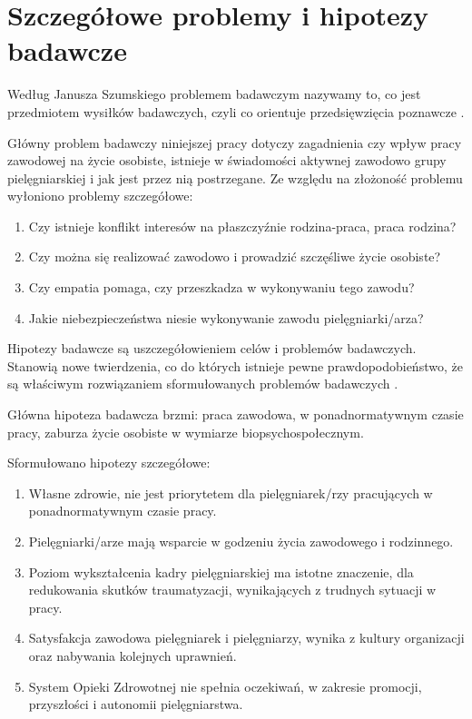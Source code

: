 \documentclass[a4paper,12pt,twoside,openany]{report}
\begin{document}
\section{Szczegółowe problemy i hipotezy badawcze}
Według Janusza Szumskiego problemem badawczym nazywamy to, co jest przedmiotem wysiłków badawczych, czyli co orientuje przedsięwzięcia poznawcze \cite{janusz}.

Główny problem badawczy niniejszej pracy dotyczy zagadnienia czy wpływ pracy zawodowej na życie osobiste, istnieje w świadomości aktywnej zawodowo grupy pielęgniarskiej i jak jest przez nią postrzegane. Ze względu na złożoność problemu wyłoniono problemy szczegółowe:
\begin{enumerate}
	\item Czy istnieje konflikt interesów na płaszczyźnie rodzina-praca, praca rodzina?
	\item Czy można się realizować zawodowo i prowadzić szczęśliwe życie osobiste?
	\item Czy empatia pomaga, czy przeszkadza w wykonywaniu tego zawodu?
	\item Jakie niebezpieczeństwa niesie wykonywanie zawodu pielęgniarki/arza?
\end{enumerate}

Hipotezy badawcze są uszczegółowieniem celów i problemów badawczych. Stanowią nowe twierdzenia, co do których istnieje pewne prawdopodobieństwo, że są właściwym rozwiązaniem sformułowanych problemów badawczych \cite{janusz}.

Główna hipoteza badawcza brzmi: praca zawodowa, w ponadnormatywnym czasie pracy, zaburza życie osobiste w wymiarze biopsychospołecznym.

Sformułowano hipotezy szczegółowe:
\begin{enumerate}
	\item  Własne zdrowie, nie jest priorytetem dla pielęgniarek/rzy pracujących w ponadnormatywnym czasie pracy.
	\item Pielęgniarki/arze mają wsparcie w  godzeniu życia zawodowego i rodzinnego.
	\item Poziom wykształcenia kadry pielęgniarskiej ma istotne znaczenie, dla  redukowania skutków traumatyzacji, wynikających z trudnych sytuacji w pracy.
	\item Satysfakcja zawodowa pielęgniarek i pielęgniarzy, wynika z kultury organizacji oraz nabywania kolejnych uprawnień.
	\item System Opieki Zdrowotnej nie spełnia oczekiwań, w zakresie promocji, przyszłości i autonomii pielęgniarstwa.
\end{enumerate}
\end{document}
